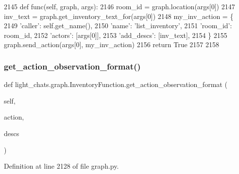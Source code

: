 \begin{DoxyCode}
2145     \textcolor{keyword}{def }func(self, graph, args):
2146         room\_id = graph.location(args[0])
2147         inv\_text = graph.get\_inventory\_text\_for(args[0])
2148         my\_inv\_action = \{
2149             \textcolor{stringliteral}{'caller'}: self.get\_name(),
2150             \textcolor{stringliteral}{'name'}: \textcolor{stringliteral}{'list\_inventory'},
2151             \textcolor{stringliteral}{'room\_id'}: room\_id,
2152             \textcolor{stringliteral}{'actors'}: [args[0]],
2153             \textcolor{stringliteral}{'add\_descs'}: [inv\_text],
2154         \}
2155         graph.send\_action(args[0], my\_inv\_action)
2156         \textcolor{keywordflow}{return} \textcolor{keyword}{True}
2157 
2158 
\end{DoxyCode}
\mbox{\label{classlight__chats_1_1graph_1_1InventoryFunction_a9527cd8b211efa8aafc21b2a40b14760}} 
\subsubsection{\texorpdfstring{get\+\_\+action\+\_\+observation\+\_\+format()}{get\_action\_observation\_format()}}
{\footnotesize\ttfamily def light\+\_\+chats.\+graph.\+Inventory\+Function.\+get\+\_\+action\+\_\+observation\+\_\+format (\begin{DoxyParamCaption}\item[{}]{self,  }\item[{}]{action,  }\item[{}]{descs }\end{DoxyParamCaption})}



Definition at line 2128 of file graph.\+py.


